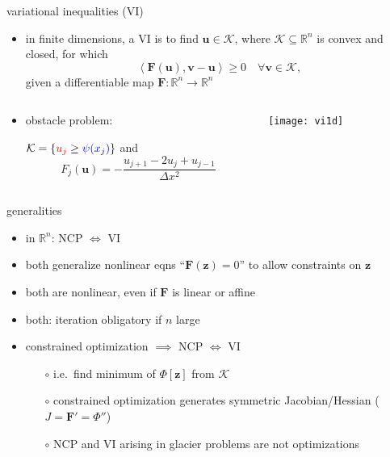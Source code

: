 \documentclass[xcolor={dvipsnames}]{beamer}
\newcommand\bu{\mathbf{u}}
\newcommand\bv{\mathbf{v}}
\newcommand\bz{\mathbf{z}}
\newcommand\bF{\mathbf{F}}
\newcommand\RR{\mathbb{R}}
\newcommand{\ip}[2]{\ensuremath{\left<#1,#2\right>}}
\begin{document}
\begin{frame}{variational inequalities (VI)}

\begin{itemize}
\item in finite dimensions, a VI is to find $\bu\in\mathcal{K}$, where $\mathcal{K}\subseteq \RR^n$ is convex and closed, for which
\begin{equation}
     \ip{\bF(\bu)}{\bv-\bu} \ge 0 \quad \forall \bv \in \mathcal{K},
\end{equation}
given a differentiable map $\bF:\RR^n \to \RR^n$
\end{itemize}

\begin{columns}
\begin{column}{0.4\textwidth}
\small
\begin{itemize}
\item obstacle problem:

$\mathcal{K} = \{{\color{red} u_j} \ge {\color{blue} \psi(x_j)}\}$ and
  $$F_j(\bu) = - \frac{u_{j+1} - 2 u_j + u_{j-1}}{\Delta x^2}$$
\end{itemize}
\end{column}
\begin{column}{0.6\textwidth}
\texttt{[image: vi1d]}
\end{column}
\end{columns}\end{frame}


\begin{frame}{generalities}

\begin{itemize}
\item in $\RR^n$: NCP $\iff$ VI
\item both generalize nonlinear eqns ``$\bF(\bz)=0$'' to allow constraints on $\bz$
\item both are nonlinear, even if $\bF$ is linear or affine
\item both: iteration obligatory if $n$ large
\item constrained optimization $\implies$ NCP $\iff$ VI
  \begin{itemize}
  \item[$\circ$]  i.e.~find minimum of $\Phi[\bz]$ from $\mathcal{K}$
  \item[$\circ$]  constrained optimization generates symmetric Jacobian/Hessian ($J = \bF' = \Phi''$)
  \item[$\circ$]  NCP and VI arising in glacier problems are \alert{not} optimizations
  \end{itemize}
\end{itemize}
\end{frame}
\end{document}
